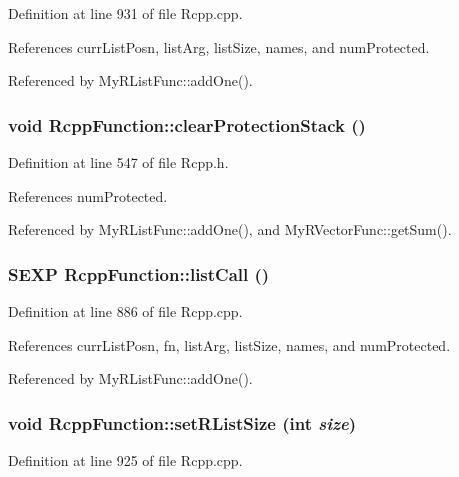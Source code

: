 Definition at line 931 of file Rcpp.cpp.

References currListPosn, listArg, listSize, names, and numProtected.

Referenced by MyRListFunc::addOne().\hypertarget{classRcppFunction_689c914636f0f0e86b90da4425c6e6a3}{
\subsubsection[{clearProtectionStack}]{\setlength{\rightskip}{0pt plus 5cm}void RcppFunction::clearProtectionStack ()}}
\label{classRcppFunction_689c914636f0f0e86b90da4425c6e6a3}




Definition at line 547 of file Rcpp.h.

References numProtected.

Referenced by MyRListFunc::addOne(), and MyRVectorFunc::getSum().\hypertarget{classRcppFunction_0cc9d29ab7db552494dddefaa78e6578}{
\subsubsection[{listCall}]{\setlength{\rightskip}{0pt plus 5cm}SEXP RcppFunction::listCall ()}}
\label{classRcppFunction_0cc9d29ab7db552494dddefaa78e6578}




Definition at line 886 of file Rcpp.cpp.

References currListPosn, fn, listArg, listSize, names, and numProtected.

Referenced by MyRListFunc::addOne().\hypertarget{classRcppFunction_f3dbcf8dcfbdfc49ef566b5efd0ad978}{
\subsubsection[{setRListSize}]{\setlength{\rightskip}{0pt plus 5cm}void RcppFunction::setRListSize (int {\em size})}}
\label{classRcppFunction_f3dbcf8dcfbdfc49ef566b5efd0ad978}




Definition at line 925 of file Rcpp.cpp.

